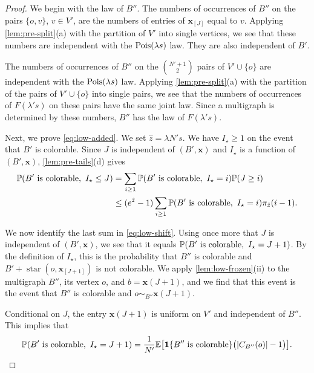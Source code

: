 \begin{proof}
We begin with the law of $B''$. The numbers of occurrences of $B''$ on the pairs $\{o, v\}$, $v \in V'$, are the numbers of entries of $\mathbf x_{[J]}$ equal to $v$. Applying \cref{lem:pre-split}(a) with the partition of $V'$ into single vertices, we see that these numbers are independent with the $\operatorname{Pois}(\lambda s)$ law. They are also independent of $B'$.

The numbers of occurrences of $B''$ on the $\binom{N' + 1}{2}$ pairs of $V' \cup \{o\}$ are independent with the $\operatorname{Pois}(\lambda s)$ law. Applying \cref{lem:pre-split}(a) with the partition of the pairs of $V' \cup \{o\}$ into single pairs, we see that the numbers of occurrences of $F(\lambda' s)$ on these pairs have the same joint law. Since a multigraph is determined by these numbers, $B''$ has the law of $F(\lambda' s)$.

Next, we prove \eqref{eq:low-added}. We set $\hat z = \lambda N's$. We have $I_\star \ge 1$ on the event that $B'$ is colorable. Since $J$ is independent of $(B', \mathbf x)$ and $I_\star$ is a function of $(B', \mathbf x)$, \cref{lem:pre-tails}(d) gives
\begin{equation}\label{eq:low-shift}
\begin{split}
\Pp(B' \text{ is colorable}, \ I_\star \le J) &= \sum_{i \ge 1} \Pp(B' \text{ is colorable}, \ I_\star = i) \Pp(J \ge i) \\
&\le (e^{\hat z} - 1) \sum_{i \ge 1} \Pp(B' \text{ is colorable}, \ I_\star = i) \pi_{\hat z}(i - 1).
\end{split}
\end{equation}

We now identify the last sum in \eqref{eq:low-shift}. Using once more that $J$ is independent of $(B', \mathbf x)$, we see that it equals $\mathbb P(B' \text{ is colorable}, \ I_\star = J + 1)$. By the definition of $I_\star$, this is the probability that $B''$ is colorable and $B' + \operatorname{star}(o, \mathbf x_{[J + 1]})$ is not colorable. We apply \cref{lem:low-frozen}(ii) to the multigraph $B''$, its vertex $o$, and $b = \mathbf x(J + 1)$, and we find that this event is the event that $B''$ is colorable and $o \sim_{B''} \mathbf x(J + 1)$.

Conditional on $J$, the entry $\mathbf x(J + 1)$ is uniform on $V'$ and independent of $B''$. This implies that
\begin{equation}\label{eq:low-class}
\mathbb P(B' \text{ is colorable}, \ I_\star = J + 1) = \frac{1}{N'} \mathbb E\bigl[\mathbf 1\{B'' \text{ is colorable}\} \bigl(|C_{B''}(o)| - 1\bigr)\bigr].
\end{equation}


\end{proof}
